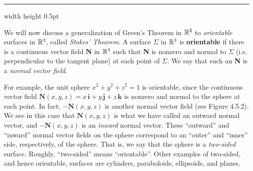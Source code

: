 \hrule width \textwidth height 0.5pt
\vspace{3mm}

We will now discuss a generalization of Green's Theorem in $\mathbb{R}^{2}$ to \emph{orientable} surfaces in $\mathbb{R}^{3}$,
called \emph{Stokes' Theorem}. A surface $\Sigma$ in
$\mathbb{R}^{3}$ is \textbf{orientable} if there is a continuous vector field \textbf{N} in $\mathbb{R}^{3}$ such that
\textbf{N} is nonzero and normal to $\Sigma$ (i.e. perpendicular to the tangent plane) at each point of $\Sigma$. We say
that such an \textbf{N} is a \emph{normal vector field}.

\piccaption[]{}
For example, the unit sphere $x^2 + y^2 + z^2 = 1$ is orientable, since the continuous vector field
$\textbf{N}(x,y,z) = x\,\textbf{i} + y\,\textbf{j} + z\,\textbf{k}$ is nonzero and normal to the sphere at each point.
In fact, $-\textbf{N}(x,y,z)$ is another normal vector field (see Figure 4.5.2). We see in this case that
$\textbf{N}(x,y,z)$ is what we have called an outward normal vector, and $-\textbf{N}(x,y,z)$ is an \emph{inward} normal
vector. These ``outward'' and ``inward'' normal vector fields on the sphere correspond to an ``outer'' and
``inner'' side, respectively, of the sphere.
That is, we say that the sphere is a \emph{two-sided} surface.
Roughly, ``two-sided'' means ``orientable''.
Other examples of two-sided, and hence orientable, surfaces are
cylinders, paraboloids, ellipsoids, and planes.

